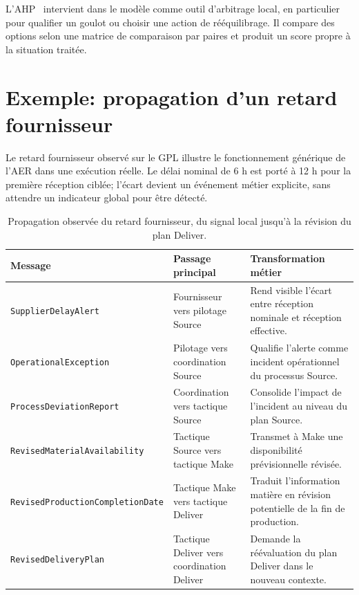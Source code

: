 L'AHP~\cite{saaty1990} intervient dans le modèle comme outil d'arbitrage local, en particulier pour qualifier un goulot ou choisir une action de rééquilibrage. Il compare des options selon une matrice de comparaison par paires et produit un score propre à la situation traitée.


\section{Exemple: propagation d'un retard fournisseur}

Le retard fournisseur observé sur le GPL illustre le fonctionnement générique de l'AER dans une exécution réelle. Le délai nominal de 6 h est porté à 12 h pour la première réception ciblée; l'écart devient un événement métier explicite, sans attendre un indicateur global pour être détecté.

\begin{table}[H]
  \centering
  \small
  \begin{tabularx}{\textwidth}{L{0.27\textwidth} L{0.19\textwidth} Y}
    \toprule
    Message & Passage principal & Transformation métier \\
    \midrule
    \texttt{Supplier\-Delay\-Alert} & Fournisseur vers pilotage Source & Rend visible l'écart entre réception nominale et réception effective. \\
    \texttt{Operational\-Exception} & Pilotage vers coordination Source & Qualifie l'alerte comme incident opérationnel du processus Source. \\
    \texttt{Process\-Deviation\-Report} & Coordination vers tactique Source & Consolide l'impact de l'incident au niveau du plan Source. \\
    \texttt{Revised\-Material\-Availability} & Tactique Source vers tactique Make & Transmet à Make une disponibilité prévisionnelle révisée. \\
    \texttt{Revised\-Production\-Completion\-Date} & Tactique Make vers tactique Deliver & Traduit l'information matière en révision potentielle de la fin de production. \\
    \texttt{Revised\-Delivery\-Plan} & Tactique Deliver vers coordination Deliver & Demande la réévaluation du plan Deliver dans le nouveau contexte. \\
    \bottomrule
  \end{tabularx}
  \caption{Propagation observée du retard fournisseur, du signal local jusqu'à la révision du plan Deliver.}
  \label{tab:propagation-retard-doc}
\end{table}

